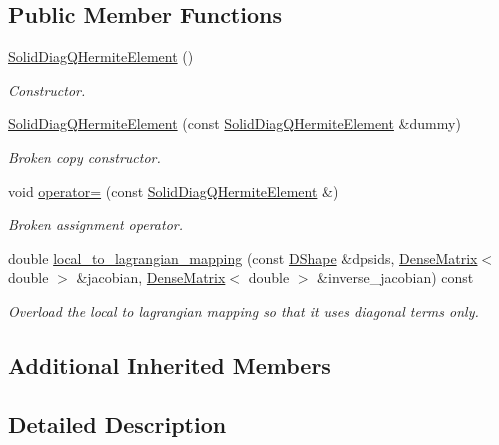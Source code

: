 \subsection*{Public Member Functions}
\begin{DoxyCompactItemize}
\item 
\hyperlink{classoomph_1_1SolidDiagQHermiteElement_a93bda1d179d2855ec13a0c42b27a51b7}{Solid\+Diag\+Q\+Hermite\+Element} ()
\begin{DoxyCompactList}\small\item\em Constructor. \end{DoxyCompactList}\item 
\hyperlink{classoomph_1_1SolidDiagQHermiteElement_a4971be4d83c155ab34d6e808dacb01ea}{Solid\+Diag\+Q\+Hermite\+Element} (const \hyperlink{classoomph_1_1SolidDiagQHermiteElement}{Solid\+Diag\+Q\+Hermite\+Element} \&dummy)
\begin{DoxyCompactList}\small\item\em Broken copy constructor. \end{DoxyCompactList}\item 
void \hyperlink{classoomph_1_1SolidDiagQHermiteElement_a330dcbff2c869083f7009325d85d15d6}{operator=} (const \hyperlink{classoomph_1_1SolidDiagQHermiteElement}{Solid\+Diag\+Q\+Hermite\+Element} \&)
\begin{DoxyCompactList}\small\item\em Broken assignment operator. \end{DoxyCompactList}\item 
double \hyperlink{classoomph_1_1SolidDiagQHermiteElement_a781e03c735c8c17533315781982882e1}{local\+\_\+to\+\_\+lagrangian\+\_\+mapping} (const \hyperlink{classoomph_1_1DShape}{D\+Shape} \&dpsids, \hyperlink{classoomph_1_1DenseMatrix}{Dense\+Matrix}$<$ double $>$ \&jacobian, \hyperlink{classoomph_1_1DenseMatrix}{Dense\+Matrix}$<$ double $>$ \&inverse\+\_\+jacobian) const
\begin{DoxyCompactList}\small\item\em Overload the local to lagrangian mapping so that it uses diagonal terms only. \end{DoxyCompactList}\end{DoxyCompactItemize}
\subsection*{Additional Inherited Members}


\subsection{Detailed Description}
